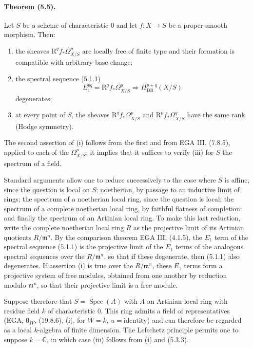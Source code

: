 \documentclass[10pt]{article}
\newcommand{\R}{\mathrm R}
\providecommand{\C}{\mathbb C}
\providecommand{\Spec}{\operatorname{Spec}}
\providecommand{\DR}{\operatorname{DR}}
\begin{document}
\paragraph{Theorem (5.5).} Let $S$ be a scheme of characteristic $0$ and let $f:X\to S$ be a proper smooth morphism. Then:
\begin{enumerate}[label=(\roman*)]
\item the sheaves $\R^qf_*\Omega_{X/S}^p$ are locally free of finite type and their formation is compatible with arbitrary base change;
\item the spectral sequence (5.1.1)
\[
E_1^{pq}=\R^qf_*\Omega_{X/S}^p\Longrightarrow H_{\DR}^{p+q}(X/S)
\]
degenerates;
\item at every point of $S$, the sheaves $\R^qf_*\Omega_{X/S}^p$ and $\R^pf_*\Omega_{X/S}^q$ have the same rank (Hodge symmetry).
\end{enumerate}
The second assertion of (i) follows from the first and from EGA III, (7.8.5), applied to each of the $\Omega_{X/S}^p$; it implies that it suffices to verify (iii) for $S$ the spectrum of a field.

Standard arguments allow one to reduce successively to the case where $S$ is affine, since the question is local on $S$; noetherian, by passage to an inductive limit of rings; the spectrum of a noetherian local ring, since the question is local; the spectrum of a complete noetherian local ring, by faithful flatness of completion; and finally the spectrum of an Artinian local ring. To make this last reduction, write the complete noetherian local ring $R$ as the projective limit of its Artinian quotients $R/\mathfrak m^n$. By the comparison theorem EGA III, (4.1.5), the $E_1$ term of the spectral sequence (5.1.1) is the projective limit of the $E_1$ terms of the analogous spectral sequences over the $R/\mathfrak m^n$, so that if these degenerate, then (5.1.1) also degenerates. If assertion (i) is true over the $R/\mathfrak m^n$, these $E_1$ terms form a projective system of free modules, obtained from one another by reduction modulo $\mathfrak m^n$, so that their projective limit is a free module.

Suppose therefore that $S=\Spec(A)$ with $A$ an Artinian local ring with residue field $k$ of characteristic $0$. This ring admits a field of representatives (EGA, $0_{IV}$, (19.8.6), (i), for $W=k$, $u=\mathrm{identity}$) and can therefore be regarded as a local $k$-algebra of finite dimension. The Lefschetz principle permits one to suppose $k=\C$, in which case (iii) follows from (i) and (5.3.3).
\end{document}
